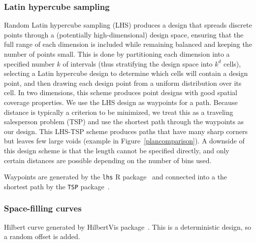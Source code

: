 \documentclass[review]{elsarticle}
\begin{document}
\subsubsection{Latin hypercube sampling}
Random Latin hypercube sampling (LHS) produces a design that spreads discrete
points through a (potentially high-dimensional) design space, ensuring that
the full range of each dimension is included while remaining balanced and
keeping the number of points small. This is done by partitioning each dimension
into a specified number \(k\) of intervals (thus stratifying the design space
into \(k^{d}\) cells), selecting a Latin hypercube design to determine which
cells will contain a design point, and then drawing each design point from a
uniform distribution over its cell. In two dimensions, this scheme produces
point designs with good spatial coverage properties. We use the LHS design as
waypoints for a path. Because distance is typically a criterion to be
minimized, we treat this as a traveling salesperson problem (TSP) and use the
shortest path through the waypoints as our design. This LHS-TSP scheme produces
paths that have many sharp corners but leaves few large voids (example in
Figure~\ref{plancomparison}). A downside of this design scheme is that the length
cannot be specified directly, and only certain distances are possible depending
on the number of bins used.

Waypoints are generated by the \texttt{lhs} R package~\cite{lhs}
and connected into a the shortest path by the \texttt{TSP} package~\citep{tsp}.

\subsubsection{Space-filling curves}
Hilbert curve generated by HilbertVis package~\citep{hilbertvis}. This is a
deterministic design, so a random offset is added.

\end{document}

